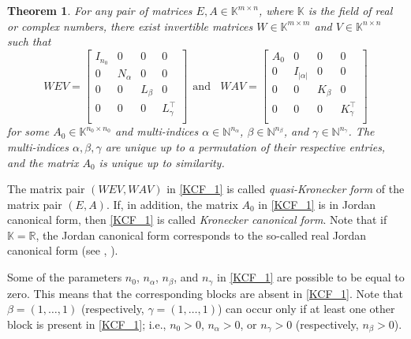 \documentclass[preprint,12pt]{elsarticle}
\numberwithin{equation}{section}
\newtheorem{theorem}{Theorem}[section]
\theoremstyle{definition}
\begin{document}
\begin{theorem}\label{Th_KCF} For any pair of matrices $E,A\in \mathbb{K}^{m\times n}$, where $\mathbb{K}$ is the field of real or complex numbers, there exist invertible matrices $W \in \mathbb{K}^{m\times m}$ and $V \in \mathbb{K}^{n\times n}$ such that
\begin{equation}\label{KCF_1}
WEV=
\begin{bmatrix} I_{n_0}& 0 & 0 & 0\\
0&  N_\alpha & 0 & 0\\
0& 0 & L_\beta & 0\\
0& 0 & 0 & L_\gamma^\top\\
\end{bmatrix} ~~ \text{and}~~~~ WAV=
\begin{bmatrix} A_0& 0 & 0 & 0\\
0& I_{|\alpha|} & 0 & 0\\
0& 0 & K_{\beta} & 0\\
0& 0 & 0 & K_\gamma^\top\\
\end{bmatrix}
\end{equation}
for some $A_0\in \mathbb{K}^{n_0\times n_0}$ and multi-indices $\alpha\in \mathbb{N}^{n_{\alpha}}$, $\beta\in \mathbb{N}^{n_{\beta}}$, and $\gamma\in \mathbb{N}^{n_{\gamma}}$. The multi-indices $\alpha, \beta, \gamma$ are unique up to a permutation of their respective entries, and the matrix $A_0$ is unique up to similarity.
\end{theorem}
 The matrix pair $(WEV, WAV)$ in \eqref{KCF_1} is called \emph{quasi-Kronecker form} of the matrix pair $(E,A)$. If, in addition, the matrix $A_0$ in \eqref{KCF_1} is in Jordan canonical form, then \eqref{KCF_1} is called \emph{Kronecker canonical form}. Note that if $\mathbb{K}=\mathbb{R}$, the Jordan canonical form corresponds to the so-called real Jordan canonical form (see \cite{LancasterRodman2005}, \cite{Puche_Reis_2018_ConstantcoefficientDAE}). 

Some of the parameters $n_0$, $n_{\alpha}$, $n_{\beta}$, and $n_{\gamma}$ in \eqref{KCF_1} are possible to be equal to zero. This means that the corresponding blocks are absent in \eqref{KCF_1}. 
Note that $\beta=(1,\ldots,1)$ (respectively, $\gamma=(1,\ldots,1)$) can occur only if at least one other block is present in \eqref{KCF_1}; i.e., $n_0>0$, $n_\alpha>0$, or $n_\gamma>0$ (respectively, $n_\beta>0$).
 
\end{document}
